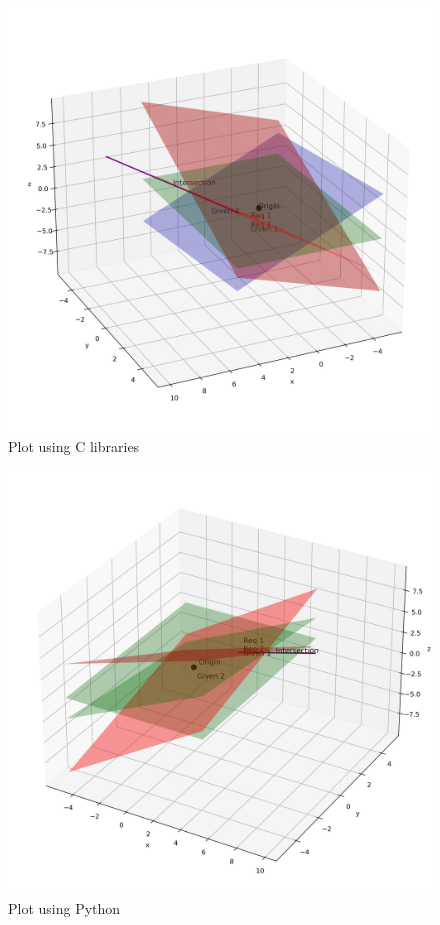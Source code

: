 \documentclass{beamer}
\numberwithin{equation}{section}
\begin{document}
\begin{figure}[H]
	\centering
	\includegraphics[scale=0.25]{img1}
	\caption*{Plot using C libraries}
	\label{img1}
\end{figure}
\begin{figure}[H]
	\centering
	\includegraphics[scale=0.25]{img2}
	\caption*{Plot using Python}
	\label{img2}
\end{figure}
\end{document}

